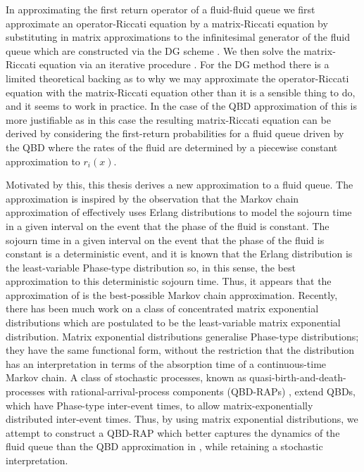 In approximating the first return operator of a fluid-fluid queue we first approximate an operator-Riccati equation by a matrix-Riccati equation by substituting in matrix approximations to the infinitesimal generator of the fluid queue which are constructed via the DG scheme \cite{blnos2022}. We then solve the matrix-Riccati equation via an iterative procedure \citep{bean2005b,blnos2022}. For the DG method there is a limited theoretical backing as to why we may approximate the operator-Riccati equation with the matrix-Riccati equation other than it is a sensible thing to do, and it seems to work in practice. In the case of the QBD approximation of \cite{bo2013} this is more justifiable as in this case the resulting matrix-Riccati equation can be derived by considering the first-return probabilities for a fluid queue driven by the QBD \citep{bean2005} where the rates of the fluid are determined by a piecewise constant approximation to \(r_i(x)\). 

Motivated by this, this thesis derives a new approximation to a fluid queue. The approximation is inspired by the observation that the Markov chain approximation of \cite{bo2013} effectively uses Erlang distributions to model the sojourn time in a given interval on the event that the phase of the fluid is constant. The sojourn time in a given interval on the event that the phase of the fluid is constant is a deterministic event, and it is known that the Erlang distribution is the least-variable Phase-type distribution so, in this sense, the best approximation to this deterministic sojourn time. Thus, it appears that the approximation of \cite{bo2013} is the best-possible Markov chain approximation. Recently, there has been much work on a class of concentrated matrix exponential distributions \cite{hhat2020} which are postulated to be the least-variable matrix exponential distribution. Matrix exponential distributions generalise Phase-type distributions; they have the same functional form, without the restriction that the distribution has an interpretation in terms of the absorption time of a continuous-time Markov chain. A class of stochastic processes, known as quasi-birth-and-death-processes with rational-arrival-process components (QBD-RAPs) \cite{bn2010}, extend QBDs, which have Phase-type inter-event times, to allow matrix-exponentially distributed inter-event times. Thus, by using matrix exponential distributions, we attempt to construct a QBD-RAP which better captures the dynamics of the fluid queue than the QBD approximation in \cite{bo2013}, while retaining a stochastic interpretation. 

